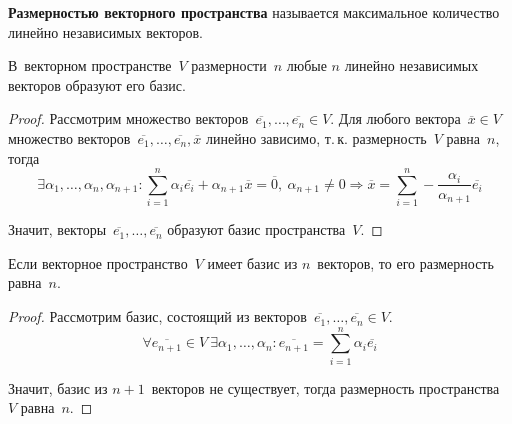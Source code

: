 \textbf{Размерностью векторного пространства} называется максимальное количество линейно независимых векторов.

\begin{theorem}
В~векторном пространстве~$V$ размерности~$n$ любые $n$ линейно независимых векторов образуют его базис.
\end{theorem}
\begin{proof}
Рассмотрим множество векторов~$\overline{e_1}, \ldots, \overline{e_n} \in V$.
Для любого вектора~$\overline x \in V$ множество векторов~$\overline{e_1}, \ldots, \overline{e_n}, \overline x$ линейно зависимо, т.\,к. размерность~$V$ равна~$n$, тогда
\begin{equation*}
\exists \alpha_1, \ldots, \alpha_n, \alpha_{n+1} \colon
\sum_{i=1}^n \alpha_i \overline{e_i} + \alpha_{n+1} \overline x = \overline 0, \
\alpha_{n+1} \neq 0 \Rightarrow
\overline x = \sum_{i=1}^n -\frac{\alpha_i}{\alpha_{n+1}} \overline{e_i}
\end{equation*}

Значит, векторы~$\overline{e_1}, \ldots, \overline{e_n}$ образуют базис пространства~$V$.
\end{proof}

\begin{theorem}
Если векторное пространство~$V$ имеет базис из $n$~векторов, то его размерность равна~$n$.
\end{theorem}
\begin{proof}
Рассмотрим базис, состоящий из векторов~$\overline{e_1}, \ldots, \overline{e_n} \in V$.
\begin{equation*}
\forall \overline{e_{n+1}} \in V \
\exists \alpha_1, \ldots, \alpha_n \colon
\overline{e_{n+1}} = \sum_{i=1}^n \alpha_i \overline{e_i}
\end{equation*}

Значит, базис из $n + 1$~векторов не существует, тогда размерность пространства~$V$ равна~$n$.
\end{proof}